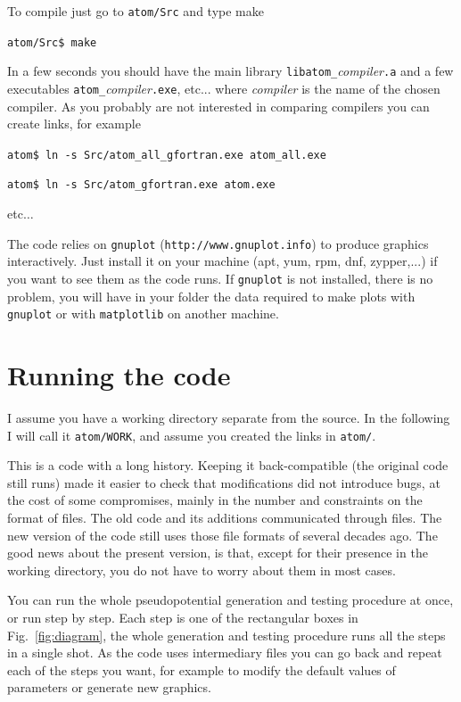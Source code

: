 \documentclass[11pt]{article}
\begin{document}
To compile just go to \texttt{atom/Src} and type make

\noindent\texttt{atom/Src\$ make}

In a few seconds you should have the main library \texttt{libatom{\_}}\textit{compiler}\texttt{.a}
and a few executables \texttt{atom{\_}}\textit{compiler}\texttt{.exe}, etc...
where \textit{compiler} is the name of the chosen compiler.
As you probably are not interested in comparing compilers you can create links,
for example

\noindent\texttt{atom\$ ln -s Src/atom\_all\_gfortran.exe atom\_all.exe}

\noindent\texttt{atom\$ ln -s Src/atom\_gfortran.exe atom.exe}

etc$\ldots$

The code relies on \texttt{gnuplot} (\texttt{http://www.gnuplot.info}) to produce graphics interactively.  Just install it
on your machine (apt, yum, rpm, dnf, zypper,...) if you want to see them as the code runs.
If \texttt{gnuplot} is not installed, there is no problem,
you will have in your folder the data required to make plots with \texttt{gnuplot}
or with \texttt{matplotlib} on another machine.




\section{Running the code}
\label{sec:run}

I assume you have a working directory separate from the source.  In the following I will call it
\texttt{atom/WORK}, and assume you created the links in \texttt{atom/}.

This is a code with a long history.  Keeping it back-compatible (the original code still runs)
made it easier to check that modifications did not introduce bugs, at the cost of some compromises,
mainly in the number and constraints on the format of files.
The old code and its additions communicated through files.  The new version of the
code still uses those file formats of several decades ago.
The good news about the present version, is that, except for their presence in the working directory,
you do not have to worry about them in most cases.

You can run the whole pseudopotential generation and testing procedure at once, or run step by step.  Each step is one of the rectangular boxes in Fig.~\ref{fig:diagram},
the whole generation and testing procedure runs all the steps in a single shot.
As the code uses intermediary files you can go back and repeat
each of the steps you want, for example
to modify the default values of parameters or generate new graphics.
\end{document}
